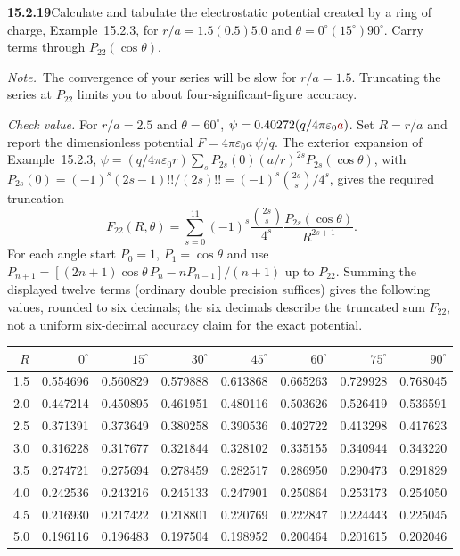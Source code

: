 \par\bigskip
\noindent\textbf{15.2.19}\quad Calculate and tabulate the electrostatic
potential created by a ring of charge, Example~15.2.3, for
$r/a=1.5(0.5)5.0$ and $\theta=0^{\circ}(15^{\circ})90^{\circ}$. Carry
terms through $P_{22}(\cos\theta)$.
\par\emph{Note.}~The convergence of your series will be slow for
$r/a=1.5$. Truncating the series at $P_{22}$ limits you to about
four-significant-figure accuracy.
\par\nobreak\hfill\emph{Check value.}\enspace
For $r/a=2.5$ and $\theta=60^{\circ}$,
$\psi=0.40272(q/4\pi\varepsilon_{0}\erratum{a})$.
\solution
Set $R=r/a$ and report the dimensionless potential
$F=4\pi\varepsilon_0a\,\psi/q$. The exterior expansion of
Example~15.2.3,
$\psi=(q/4\pi\varepsilon_0r)\sum_sP_{2s}(0)(a/r)^{2s}P_{2s}(\cos\theta)$,
with $P_{2s}(0)=(-1)^s(2s-1)!!/(2s)!!=(-1)^s\binom{2s}{s}/4^s$, gives
the required truncation
\[
F_{22}(R,\theta)=\sum_{s=0}^{11}
(-1)^s\frac{\binom{2s}{s}}{4^s}
\frac{P_{2s}(\cos\theta)}{R^{2s+1}}.
\]
For each angle start $P_0=1$, $P_1=\cos\theta$ and use
$P_{n+1}=[(2n+1)\cos\theta\,P_n-nP_{n-1}]/(n+1)$ up to $P_{22}$.
Summing the displayed twelve terms (ordinary double precision suffices)
gives the following values, rounded to six decimals; the six decimals
describe the truncated sum $F_{22}$, not a uniform six-decimal accuracy
claim for the exact potential.
\begin{center}\small
\setlength{\tabcolsep}{4pt}
\begin{tabular}{r|rrrrrrr}\toprule
$R$&$0^\circ$&$15^\circ$&$30^\circ$&$45^\circ$&$60^\circ$&$75^\circ$&$90^\circ$\\\midrule
1.5&0.554696&0.560829&0.579888&0.613868&0.665263&0.729928&0.768045\\
2.0&0.447214&0.450895&0.461951&0.480116&0.503626&0.526419&0.536591\\
2.5&0.371391&0.373649&0.380258&0.390536&0.402722&0.413298&0.417623\\
3.0&0.316228&0.317677&0.321844&0.328102&0.335155&0.340944&0.343220\\
3.5&0.274721&0.275694&0.278459&0.282517&0.286950&0.290473&0.291829\\
4.0&0.242536&0.243216&0.245133&0.247901&0.250864&0.253173&0.254050\\
4.5&0.216930&0.217422&0.218801&0.220769&0.222847&0.224443&0.225045\\
5.0&0.196116&0.196483&0.197504&0.198952&0.200464&0.201615&0.202046\\
\bottomrule\end{tabular}\end{center}

